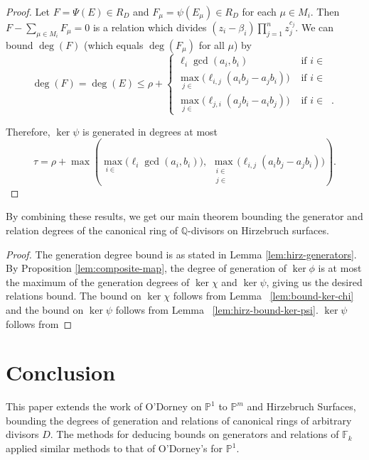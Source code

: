 \documentclass{amsart}
\theoremstyle{plain}
\theoremstyle{definition}
\theoremstyle{remark}
\numberwithin{equation}{section}
\newcommand\bq{{\mathbb Q}}
\newcommand\bp{{\mathbb P}}
\newcommand\bida{a}
\newcommand\bidb{b}
\newcommand\hirz{\mathbb{F}}
\DeclareMathOperator{\Te}{T_=}
\DeclareMathOperator{\Tp}{T_+}
\DeclareMathOperator{\Tm}{T_-}
\begin{document}
\begin{proof}
Let $F = \Psi(E) \in R_D$
 and $F_\mu = \psi(E_\mu) \in R_D$ for each $\mu \in M_i$.  
Then $F - \sum_{\mu \in M_i} F_\mu = 0$ is a relation %
which divides $(z_i - \beta_i) \prod_{j = 1}^n z_j^{c_j}$. 
We can bound $\deg(F)$ (which equals $\deg(F_\mu)$ for all $\mu$) by
\[
	\deg(F) = \deg(E) \le \rho + \begin{cases}
	\ell_i \gcd(\bida_i, \bidb_i)	&\mbox{ if } i \in \Te \\
	\max_{j \in \Tm} \bigl(\ell_{i, j} (\bida_i \bidb_j - \bida_j \bidb_i)\bigr)
	&\mbox{ if } i \in \Tp \\
	\max_{j \in \Tp} \bigl(\ell_{j, i} (\bida_j \bidb_ i - \bida_i \bidb_j) \bigr)
	&\mbox{ if } i \in \Tm. \end{cases}
	\]

\noindent
Therefore, $\ker \psi$ is generated in degrees at most
\[
	\tau = \rho
	+ \max \left(\max_{i\in \Te} \bigl(\ell_i \gcd(a_i, b_i) \bigr),
	\; \max_{\substack{i \in \Tp \\ j \in \Tm}} \bigl(\ell_{i, j}
	(\bida_i \bidb_j - \bida_j
	\bidb_i) \bigr) \right).
\]
\end{proof}

By combining these results, we get our main theorem bounding
the generator and relation degrees of the canonical ring of
$\bq$-divisors on Hirzebruch surfaces.

\hirzrestate*

\begin{proof}
The generation degree bound is as stated in Lemma \ref{lem:hirz-generators}.
By Proposition \ref{lem:composite-map}, the degree of generation of
$\ker \phi$ is at most the maximum of the generation degrees of $\ker \chi$
and $\ker \psi$, giving us the desired relations bound. The bound on $\ker \chi$
follows from Lemma ~\ref{lem:bound-ker-chi} and the bound on $\ker \psi$
follows from Lemma ~\ref{lem:hirz-bound-ker-psi}.
$\ker \psi$ follows from 
\end{proof}


\section{Conclusion}
\label{sec:conc}
This paper extends the work of O'Dorney \cite{dorney:canonical} on $\bp^1$ to
$\bp^m$ and Hirzebruch Surfaces, bounding the degrees of generation and
relations of canonical rings of arbitrary divisors $D$.  The methods for
deducing bounds on generators and relations of $\hirz_k$ applied similar
methods to that of O'Dorney's for $\bp^1$.  
\end{document}
